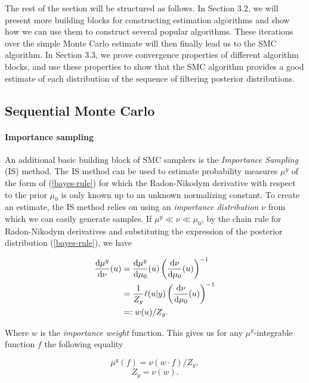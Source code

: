 The rest of the section will be structured as follows. In Section 3.2, we will present more building blocks for constructing estimation algorithms and show how we can use them to construct several popular algorithms. These iterations over the simple Monte Carlo estimate will then finally lead us to the SMC algorithm. In Section 3.3, we prove convergence properties of different algorithm blocks, and use these properties to show that the SMC algorithm provides a good estimate of each distribution of the sequence of filtering posterior distributions.

\subsection{Sequential Monte Carlo}

\paragraph{Importance sampling} An additional basic building block of SMC samplers is the \textit{Importance Sampling} (IS) method. The IS method can be used to estimate probability measures $\mu^y$ of the form of (\ref{bayes-rule}) for which the Radon-Nikodym derivative with respect to the prior $\mu_0$ is only known up to an unknown normalizing constant. To create an estimate, the IS method relies on using an \textit{importance distribution} $\nu$ from which we can easily generate samples. If $\mu^y \ll \nu \ll \mu_0$, by the chain rule for Radon-Nikodym derivatives and substituting the expression of the posterior distribution (\ref{bayes-rule}), we have

\begin{align*}
  \frac{\text{d}\mu^y}{\text{d}\nu}(u)
  &= \frac{\text{d}\mu^y}{\text{d}\mu_0}(u)\left(\frac{\text{d}\nu}{\text{d}\mu_0}(u) \right)^{-1}\\
  &= \frac1{Z_y}\ell(u|y)\left(\frac{\text{d}\nu}{\text{d}\mu_0}(u) \right)^{-1}\\
  &=: w(u) / Z_y.
\end{align*}

Where $w$ is the \textit{importance weight} function. This gives us for any $\mu^y$-integrable function $f$ the following equality

\begin{equation*}
  \mu^y(f) =  \nu(w \cdot f) / Z_y,
\end{equation*}
\begin{equation*}
  Z_y = \nu(w).
\end{equation*}

